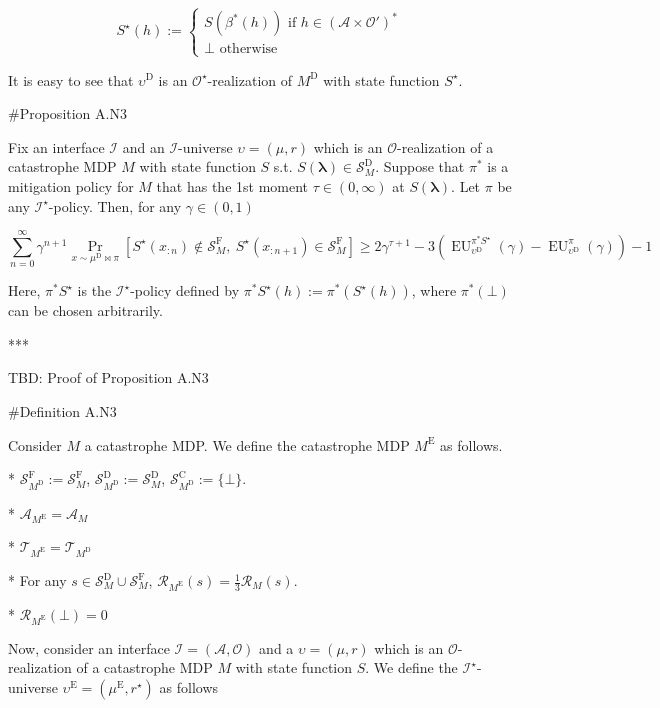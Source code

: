 \documentclass[a4paper]{article}
\newcommand{\Comment}[1]{}
\newcommand{\AP}[1]{\left(#1\right)}
\newcommand{\AB}[1]{\left[#1\right]}
\newcommand{\Pa}[2]{\underset{#1}{\operatorname{Pr}}\AB{#2}}
\newcommand{\Estr}{\boldsymbol{\lambda}}
\newcommand{\M}{\xrightarrow{\textnormal{k}}}
\newcommand{\Ob}{\mathcal{O}}
\newcommand{\A}{\mathcal{A}}
\newcommand{\St}{\mathcal{S}}
\newcommand{\T}{\mathcal{T}}
\newcommand{\R}{\mathcal{R}}
\newcommand{\In}{\mathcal{I}}
\newcommand{\RMC}{\mathrm{C}}
\newcommand{\RMD}{\mathrm{D}}
\newcommand{\RME}{\mathrm{E}}
\newcommand{\RMF}{\mathrm{F}}
\newcommand{\SF}{\St^{\RMF}}
\newcommand{\SD}{\St^{\RMD}}
\newcommand{\SC}{\St^{\RMC}}
\newcommand{\MD}{M^{\RMD}}
\newcommand{\ME}{M^{\RME}}
\newcommand{\PD}{\pi^{\RMD}}
\newcommand{\UD}{\upsilon^{\RMD}}
\newcommand{\EU}{\operatorname{EU}}
\begin{document}
$$S^\star(h):=\begin{cases} S\AP{\beta^*(h)} \text{ if } h\in\AP{\A \times \Ob'}^* \\ \bot \text{ otherwise} \end{cases}$$

It is easy to see that $\UD$ is an $\Ob^\star$-realization of $\MD$ with state function $S^\star$.

\Comment{Given $\pi: \St_M \M \A_M$, we define $\PD: \St_{\MD} \M \A_M$ by

* For any $s \in \SD_M$, $\PD(s) = \pi(s)$.

* For $s \in \{\bot,\top\}$, $\PD(s)$ is arbitrary (because of how $\T_{\MD}$ is defined, the choice affects nothing).}

\#Proposition A.N3

Fix an interface $\In$ and an $\In$-universe $\upsilon=(\mu,r)$ which is an $\Ob$-realization of a catastrophe MDP $M$ with state function $S$ s.t. $S(\Estr)\in\SD_M$. Suppose that $\pi^*$ is a mitigation policy for $M$ that has the 1st moment $\tau\in(0,\infty)$ at $S(\Estr)$. Let $\pi$ be any $\In^\star$-policy. Then, for any $\gamma\in(0,1)$

$$\sum_{n=0}^\infty \gamma^{n+1} \Pa{x \sim \mu^\RMD \bowtie \pi}{S^\star\AP{x_{:n}}\not\in\SF_M,\ S^\star\AP{x_{:n+1}}\in\SF_M} \geq 2{\gamma^{\tau+1}}-3\AP{\EU_{\UD}^{\pi^* S^\star}(\gamma)-\EU_{\UD}^{\pi}(\gamma)}-1$$

Here, $\pi^* S^\star$ is the $\In^\star$-policy defined by $\pi^*S^\star(h):=\pi^*\AP{S^\star(h)}$, where $\pi^*(\bot)$ can be chosen arbitrarily.

***

TBD: Proof of Proposition A.N3

\#Definition A.N3

Consider $M$ a catastrophe MDP. We define the catastrophe MDP $\ME$ as follows.

* $\SF_{\MD}:=\SF_M$, $\SD_{\MD}:=\SD_M$, $\SC_{\MD}:=\{\bot\}$.

* $\A_{\ME} = \A_M$

* $\T_{\ME} = \T_{\MD}$

* For any $s \in \SD_M \cup \SF_M$, $\R_{\ME}(s) = \frac{1}{3}\R_M(s)$.

* $\R_{\ME}(\bot) = 0$

Now, consider an interface $\In=(\A,\Ob)$ and a $\upsilon=(\mu,r)$ which is an $\Ob$-realization of a catastrophe MDP $M$ with state function $S$. We define the $\In^\star$-universe $\upsilon^\RME=(\mu^\RME,r^\star)$ as follows
\end{document}
